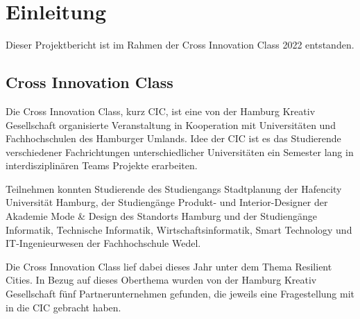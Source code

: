 \chapter{Einleitung}

    Dieser Projektbericht ist im Rahmen der Cross Innovation Class 2022 entstanden.

\section{Cross Innovation Class}

    Die Cross Innovation Class, kurz CIC, ist eine von der Hamburg Kreativ Gesellschaft organisierte Veranstaltung in Kooperation mit Universitäten und Fachhochschulen des Hamburger Umlands.
    Idee der CIC ist es das Studierende verschiedener Fachrichtungen unterschiedlicher Universitäten ein Semester lang in interdisziplinären Teams Projekte erarbeiten.

    Teilnehmen konnten Studierende des Studiengangs Stadtplanung der Hafencity Universität Hamburg, der Studiengänge Produkt- und Interior-Designer der Akademie Mode \& Design des Standorts Hamburg und der Studiengänge Informatik, Technische Informatik, Wirtschaftsinformatik, Smart Technology und IT-Ingenieurwesen der Fachhochschule Wedel.

    Die Cross Innovation Class lief dabei dieses Jahr unter dem Thema Resilient Cities. In Bezug auf dieses Oberthema wurden von der Hamburg Kreativ Gesellschaft fünf Partnerunternehmen gefunden, die jeweils eine Fragestellung mit in die CIC gebracht haben.


    \vspace{1em}
    \vspace{1em}
    

